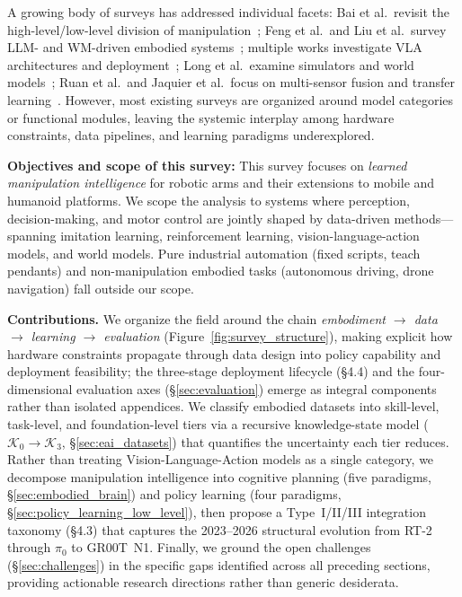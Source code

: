 \documentclass[acmsmall,screen,review,anonymous]{acmart}
\begin{document}
A growing body of surveys has addressed individual facets: Bai et al.\ revisit the high-level/low-level division of manipulation~\cite{baiUnifiedUnderstandingRobot2025}; Feng et al.\ and Liu et al.\ survey LLM- and WM-driven embodied systems~\cite{feng2025embodiedaillmsworld,liu2025aligningcyberspacephysical,liuEmbodiedIntelligenceSynergy2025}; multiple works investigate VLA architectures and deployment~\cite{kawaharazukaVisionLanguageActionModelsRobotics2025,maSurveyVisionLanguageActionModels2025,zhongSurveyVisionLanguageActionModels2025,guanEfficientVisionLanguageActionModels2025,xiangParallelsVLAModel2025}; Long et al.\ examine simulators and world models~\cite{longSurveyLearningEmbodied2025}; Ruan et al.\ and Jaquier et al.\ focus on multi-sensor fusion and transfer learning~\cite{ruanSurveyMultisensorFusion2025,jaquierTransferLearningRobotics2024}. However, most existing surveys are organized around model categories or functional modules, leaving the systemic interplay among hardware constraints, data pipelines, and learning paradigms underexplored.

\textbf{Objectives and scope of this survey:}
This survey focuses on \emph{learned manipulation intelligence} for robotic arms and their extensions to mobile and humanoid platforms. We scope the analysis to systems where perception, decision-making, and motor control are jointly shaped by data-driven methods---spanning imitation learning, reinforcement learning, vision-language-action models, and world models. Pure industrial automation (fixed scripts, teach pendants) and non-manipulation embodied tasks (autonomous driving, drone navigation) fall outside our scope.

\textbf{Contributions.}
We organize the field around the chain \emph{embodiment $\to$ data $\to$ learning $\to$ evaluation} (Figure~\ref{fig:survey_structure}), making explicit how hardware constraints propagate through data design into policy capability and deployment feasibility; the three-stage deployment lifecycle (\S4.4) and the four-dimensional evaluation axes (\S\ref{sec:evaluation}) emerge as integral components rather than isolated appendices.
We classify embodied datasets into skill-level, task-level, and foundation-level tiers via a recursive knowledge-state model ($\mathcal{K}_0 \to \mathcal{K}_3$, \S\ref{sec:eai_datasets}) that quantifies the uncertainty each tier reduces.
Rather than treating Vision-Language-Action models as a single category, we decompose manipulation intelligence into cognitive planning (five paradigms, \S\ref{sec:embodied_brain}) and policy learning (four paradigms, \S\ref{sec:policy_learning_low_level}), then propose a Type~I/II/III integration taxonomy (\S4.3) that captures the 2023--2026 structural evolution from RT-2 through $\pi_0$ to GR00T~N1.
Finally, we ground the open challenges (\S\ref{sec:challenges}) in the specific gaps identified across all preceding sections, providing actionable research directions rather than generic desiderata.
\end{document}
